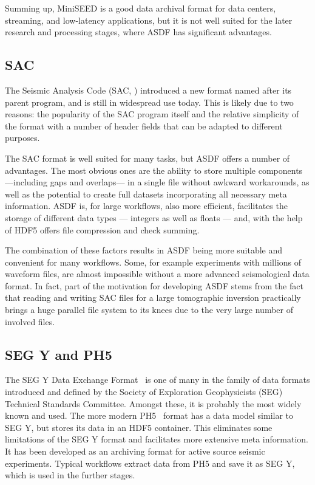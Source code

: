 Summing up, MiniSEED is a good data archival format for data centers,
streaming, and low-latency applications, but it is not well suited for the
later research and processing stages, where ASDF has significant
advantages.

\subsection{SAC}

The Seismic Analysis Code (SAC, \cite{HelffrichWookeyBastow201311})
introduced a new format named after its parent program, and is still in
widespread use today. This is likely due to two reasons: the popularity of the
SAC program itself and the relative simplicity of the format with a
number of header fields that can be adapted to different purposes.

The SAC format is well suited for many tasks, but ASDF offers
a number of advantages. The most obvious ones are the ability to store
multiple components ---including gaps and overlaps--- in a single file without
awkward workarounds, as well as the potential to create full datasets
incorporating all necessary meta information. ASDF is, for large
workflows, also more efficient, facilitates the storage of different data types ---
integers as well as floats --- and, with the help of HDF5 offers file
compression and check summing.

The combination of these factors results in ASDF being more suitable and
convenient for many workflows. Some, for example experiments with millions of
waveform files, are almost impossible without a more advanced seismological
data format.
In fact, part of the motivation for developing ASDF stems from the fact that
reading and writing SAC files for a large tomographic inversion practically
brings a huge parallel file system to its knees due to the very large number of
involved files.

\subsection{SEG Y and PH5}

\label{subsec:segy}

The SEG Y Data Exchange Format~\cite{SEGY} is one of many in the
family of data formats introduced and defined by the Society of Exploration
Geophysicists (SEG) Technical Standards Committee. Amongst these, it
is probably the most widely known and used. The more modern PH5~\cite{PH5}
format has a data model similar to SEG Y, but stores its
data in an HDF5 container. This eliminates some limitations of the
SEG Y format and facilitates more extensive meta information. It has
been developed as an archiving format for active source seismic experiments.
Typical workflows extract data from PH5 and save it as SEG Y,
which is used in the further stages.

